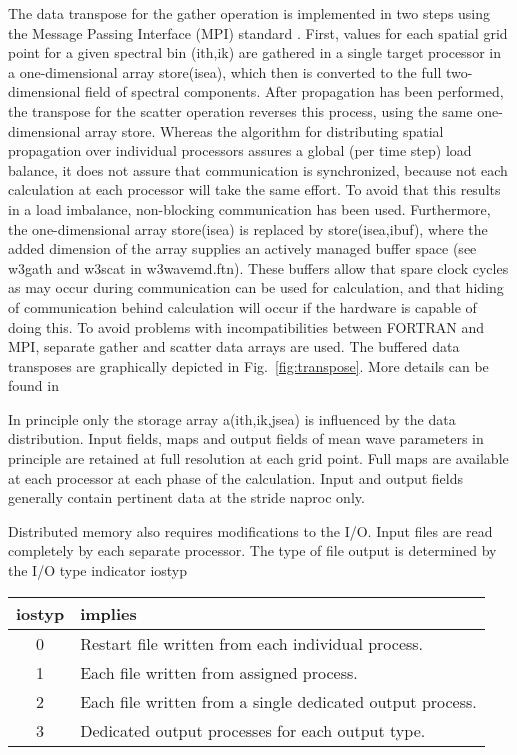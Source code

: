 The data transpose for the gather operation is implemented in two steps using
the Message Passing Interface (MPI) standard \citep[e.g.][]{bk:GLS97}. First,
values for each spatial grid point for a given spectral bin {\F(ith,ik)} are
gathered in a single target processor in a one-dimensional array {\F
store(isea)}, which then is converted to the full two-dimensional field of
spectral components. After propagation has been performed, the transpose for
the scatter operation reverses this process, using the same one-dimensional
array {\F store}. Whereas the algorithm for distributing spatial propagation
over individual processors assures a global (per time step) load balance, it
does not assure that communication is synchronized, because not each
calculation at each processor will take the same effort. To avoid that this
results in a load imbalance, non-blocking communication has been
used. Furthermore, the one-dimensional array {\F store(isea)} is replaced by
{\F store(isea,ibuf)}, where the added dimension of the array supplies an
actively managed buffer space (see {\F w3gath} and {\F w3scat} in {\file
w3wavemd.ftn}). These buffers allow that spare clock cycles as may occur
during communication can be used for calculation, and that hiding of
communication behind calculation will occur if the hardware is capable of
doing this. To avoid problems with incompatibilities between FORTRAN and MPI,
separate gather and scatter data arrays are used.  The buffered data
transposes are graphically depicted in Fig.~\ref{fig:transpose}. More details
can be found in \cite{tol:PACO02}



In principle only the storage array {\F a(ith,ik,jsea)} is influenced by the
data distribution. Input fields, maps and output fields of mean wave
parameters in principle are retained at full resolution at each grid
point. Full maps are available at each processor at each phase of the
calculation. Input and output fields generally contain pertinent data at the
stride {\F naproc} only.

Distributed memory also requires modifications to the I/O. Input files are
read completely by each separate processor. The type of file output is
determined by the I/O type indicator {\F iostyp}

\begin{center} \begin{tabular}{cl}
{\F iostyp} & implies \\ \hline
  0 & Restart file written from each individual process. \\
  1 & Each file written from assigned process. \\
  2 & Each file written from a single dedicated output process. \\
  3 & Dedicated output processes for each output type.
\end{tabular} \end{center}

